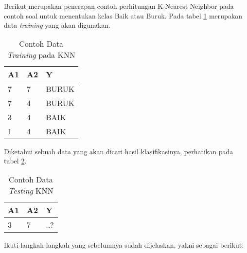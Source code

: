 Berikut merupakan penerapan contoh perhitungan K-Nearest Neighbor pada contoh soal untuk menentukan kelas Baik atau Buruk. Pada tabel \ref{knn1} merupakan data \textit{training} yang akan digunakan.
\begin{table}[!ht]
\centering
\caption{Contoh Data \textit{Training} pada KNN}
\label{knn1}
\begin{tabular}{|l|l|l|}
\hline
A1 & A2 & Y     \\ \hline
7  & 7  & BURUK \\ \hline
7  & 4  & BURUK \\ \hline
3  & 4  & BAIK  \\ \hline
1  & 4  & BAIK  \\ \hline
\end{tabular}
\end{table}
Diketahui sebuah data yang akan dicari hasil klasifikasinya, perhatikan pada tabel \ref{knn2}.
\begin{table}[!ht]
\centering
\caption{Contoh Data \textit{Testing} KNN}
\label{knn2}
\begin{tabular}{|l|l|l|}
\hline
A1 & A2 & Y   \\ \hline
3  & 7  & ..? \\ \hline
\end{tabular}
\end{table}
Ikuti langkah-langkah yang sebelumnya sudah dijelaskan, yakni sebagai berikut:
